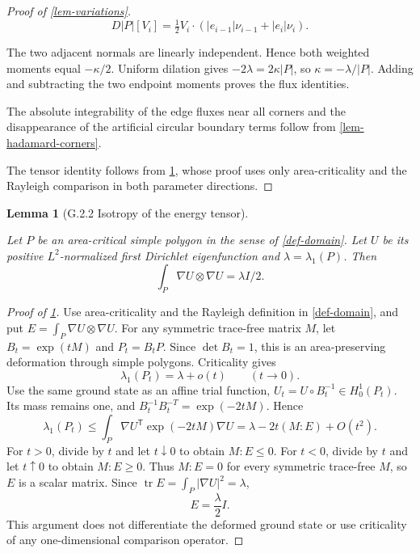 \documentclass[11pt,a4paper]{article}
\theoremstyle{proofmanuscript}
\newtheorem{lemma}[theorem]{Lemma}
\begin{document}
\begin{proof}[Proof of \ref{lem-variations}]
\[
D|P|[V_i]=\tfrac12V_i\cdot
(|e_{i-1}|\nu_{i-1}+|e_i|\nu_i).
\]

The two adjacent normals are linearly independent. Hence both weighted moments equal \(-\kappa/2\). Uniform dilation gives \(-2\lambda=2\kappa|P|\), so \(\kappa=-\lambda/|P|\). Adding and subtracting the two endpoint moments proves the flux identities.

The absolute integrability of the edge fluxes near all corners and the disappearance of the artificial circular boundary terms follow from \ref{lem-hadamard-corners}.

The tensor identity follows from \ref{lem-energy-tensor}, whose proof uses only area-criticality and the Rayleigh comparison in both parameter directions.

\end{proof}

\begin{lemma}[G.2.2 Isotropy of the energy tensor]\label{lem-energy-tensor}

Let \(P\) be an area-critical simple polygon in the sense of \ref{def-domain}. Let \(U\) be its positive \(L^2\)-normalized first Dirichlet eigenfunction and \(\lambda=\lambda_1(P)\). Then \[
\int_P\nabla U\otimes\nabla U=\lambda I/2.
\]

\end{lemma}

\begin{proof}[Proof of \ref{lem-energy-tensor}]

Use area-criticality and the Rayleigh definition in \ref{def-domain}, and put \(E=\int_P\nabla U\otimes\nabla U\). For any symmetric trace-free matrix \(M\), let \(B_t=\exp(tM)\) and \(P_t=B_tP\). Since \(\det B_t=1\), this is an area-preserving deformation through simple polygons. Criticality gives \[
\lambda_1(P_t)=\lambda+o(t)\qquad(t\to0).
\] Use the same ground state as an affine trial function, \(U_t=U\circ B_t^{-1}\in H_0^1(P_t)\). Its mass remains one, and \(B_t^{-1}B_t^{-T}=\exp(-2tM)\). Hence \[
\lambda_1(P_t)
\le\int_P\nabla U^{\mathsf T}\exp(-2tM)\nabla U
=\lambda-2t(M:E)+O(t^2).
\] For \(t>0\), divide by \(t\) and let \(t\downarrow0\) to obtain \(M:E\le0\). For \(t<0\), divide by \(t\) and let \(t\uparrow0\) to obtain \(M:E\ge0\). Thus \(M:E=0\) for every symmetric trace-free \(M\), so \(E\) is a scalar matrix. Since \(\operatorname{tr}E=\int_P|\nabla U|^2=\lambda\), \[
E=\frac\lambda2 I.\tag{G.2.2}
\] This argument does not differentiate the deformed ground state or use criticality of any one-dimensional comparison operator.

\end{proof}
\end{document}
